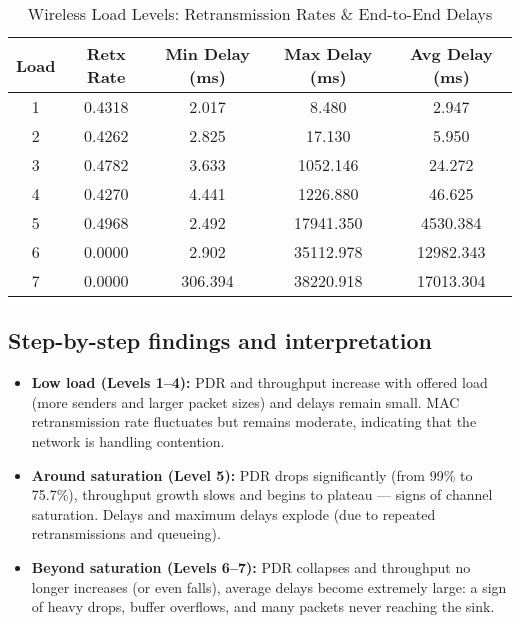 \documentclass{rapport}
\begin{document}
\begin{table}[H]
\centering
\caption{Wireless Load Levels: Retransmission Rates \& End-to-End Delays}
\begin{tabular}{|c|c|c|c|c|}
\hline
Load & Retx Rate & Min Delay (ms) & Max Delay (ms) & Avg Delay (ms) \\
\hline
1 & 0.4318 & 2.017   & 8.480     & 2.947 \\
2 & 0.4262 & 2.825   & 17.130    & 5.950 \\
3 & 0.4782 & 3.633   & 1052.146  & 24.272 \\
4 & 0.4270 & 4.441   & 1226.880  & 46.625 \\
5 & 0.4968 & 2.492   & 17941.350 & 4530.384 \\
6 & 0.0000 & 2.902   & 35112.978 & 12982.343 \\
7 & 0.0000 & 306.394 & 38220.918 & 17013.304 \\
\hline
\end{tabular}
\end{table}

\subsection{Step-by-step findings and interpretation}
\begin{itemize}
  \item \textbf{Low load (Levels 1--4):} PDR and throughput increase with offered load (more senders and larger packet sizes) and delays remain small. MAC retransmission rate fluctuates but remains moderate, indicating that the network is handling contention.
  \item \textbf{Around saturation (Level 5):} PDR drops significantly (from 99\% to 75.7\%), throughput growth slows and begins to plateau — signs of channel saturation. Delays and maximum delays explode (due to repeated retransmissions and queueing).
  \item \textbf{Beyond saturation (Levels 6--7):} PDR collapses and throughput no longer increases (or even falls), average delays become extremely large: a sign of heavy drops, buffer overflows, and many packets never reaching the sink.
\end{itemize}
\end{document}

